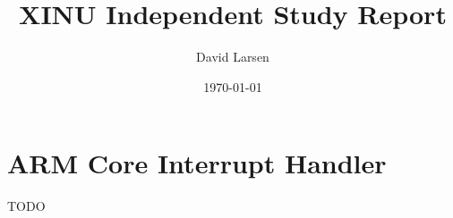 \documentclass[12pt]{article}
\title{XINU Independent Study Report}
\author{David Larsen}
\date{\today}
\newcommand{\TODO}[1]{{\huge\color{red}TODO \Large #1}}
\begin{document}
\maketitle

\tableofcontents

\section{ARM Core Interrupt Handler}

\TODO{}
\end{document}
